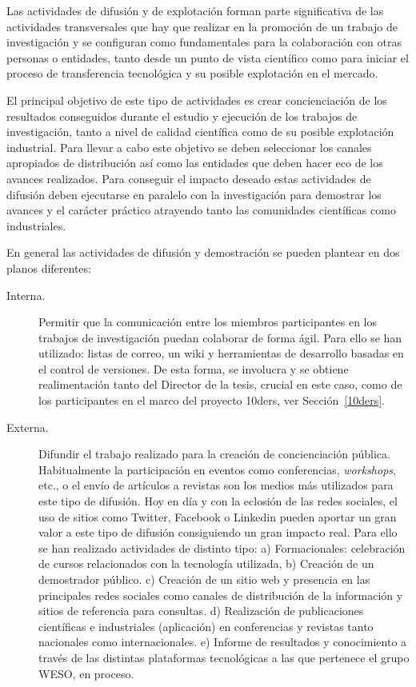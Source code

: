 Las actividades de difusión y de explotación forman parte significativa
de las actividades transversales que hay que realizar en la promoción
de un trabajo de investigación y se configuran como fundamentales
para la colaboración con otras personas o entidades, tanto desde un punto
de vista científico como para iniciar el proceso de transferencia
tecnológica y su posible explotación en el mercado.

El principal objetivo de este tipo de actividades es crear
concienciación de los resultados conseguidos durante
el estudio y ejecución de los trabajos de investigación, tanto a nivel de calidad científica como de su 
posible explotación industrial. Para llevar a cabo este objetivo
se deben seleccionar los canales apropiados de distribución así 
como las entidades que deben hacer eco de los avances realizados. Para conseguir
el impacto deseado estas actividades de difusión deben ejecutarse en paralelo
con la investigación para demostrar los avances y el carácter práctico
atrayendo tanto las comunidades científicas como industriales.

En general las actividades de difusión y demostración se pueden plantear
en dos planos diferentes:

\begin{description}
 \item [Interna.] Permitir que la comunicación entre los miembros participantes
en los trabajos de investigación puedan colaborar de forma ágil. Para ello 
se han utilizado: listas de correo, un wiki y herramientas de desarrollo
basadas en el control de versiones. De esta forma, se involucra y se obtiene
realimentación tanto del Director de la tesis, crucial en este caso, como 
de los participantes en el marco del proyecto \gls{10ders}, ver Sección~\ref{10ders}.
\item [Externa.] Difundir el trabajo realizado para la creación de concienciación
pública. Habitualmente la participación en eventos como conferencias, \textit{workshops}, etc., o el envío de artículos a revistas son los medios más utilizados para este tipo de difusión.
Hoy en día y con la eclosión de las redes sociales, el uso de sitios como Twitter, Facebook o
Linkedin pueden aportar un gran valor a este tipo de difusión consiguiendo un gran impacto
real. Para ello se han realizado actividades de distinto tipo: a) Formacionales:
celebración de cursos relacionados con la tecnología utilizada, b)
Creación de un demostrador público. c) Creación de un sitio web y presencia en
las principales redes sociales como canales de distribución de la información y
sitios de referencia para consultas. d) Realización de publicaciones científicas
e industriales (aplicación) en conferencias y revistas tanto nacionales como
internacionales. e) Informe de resultados y conocimiento a través de las
distintas plataformas tecnológicas a las que pertenece el grupo \gls{WESO}, en proceso.
\end{description}

